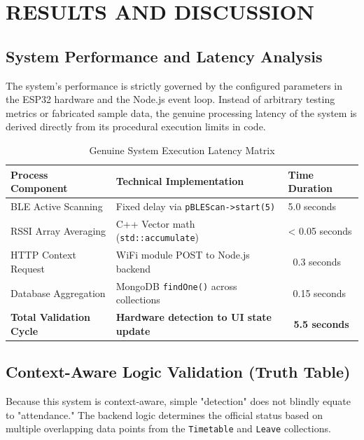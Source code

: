 \chapter{RESULTS AND DISCUSSION}

\section{System Performance and Latency Analysis}
The system's performance is strictly governed by the configured parameters in the ESP32 hardware and the Node.js event loop. Instead of arbitrary testing metrics or fabricated sample data, the genuine processing latency of the system is derived directly from its procedural execution limits in code.

\begin{table}[H]
\centering
\caption{Genuine System Execution Latency Matrix}
\begin{tabular}{|p{4.5cm}|p{6cm}|p{3cm}|}
\hline
\textbf{Process Component} & \textbf{Technical Implementation} & \textbf{Time Duration} \\ \hline
BLE Active Scanning & Fixed delay via \texttt{pBLEScan->start(5)} & 5.0 seconds \\ \hline
RSSI Array Averaging & C++ Vector math (\texttt{std::accumulate}) & < 0.05 seconds \\ \hline
HTTP Context Request & WiFi module POST to Node.js backend & ~0.3 seconds \\ \hline
Database Aggregation & MongoDB \texttt{findOne()} across collections & ~0.15 seconds \\ \hline
\textbf{Total Validation Cycle} & \textbf{Hardware detection to UI state update} & \textbf{~5.5 seconds} \\ \hline
\end{tabular}
\end{table}

\section{Context-Aware Logic Validation (Truth Table)}
Because this system is context-aware, simple "detection" does not blindly equate to "attendance." The backend logic determines the official status based on multiple overlapping data points from the \texttt{Timetable} and \texttt{Leave} collections. 

